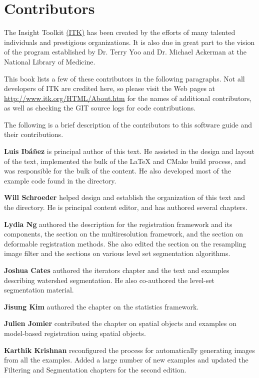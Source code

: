 \chapter*{Contributors}
\noindent

The Insight Toolkit \href{http://www.itk.org}{(ITK)} has been created by the
efforts of many talented individuals and prestigious organizations. It is also
due in great part to the vision of the program established by Dr. Terry Yoo
and Dr. Michael Ackerman at the National Library of Medicine.

This book lists a few of these contributors in the following paragraphs. Not
all developers of ITK are credited here, so please visit the Web pages at
\href{http://www.itk.org/HTML/About.htm}{http://www.itk.org/HTML/About.htm}
for the names of additional contributors, as well as checking the GIT source
logs for code contributions.

The following is a brief description of the contributors to this software
guide and their contributions.


{\bf Luis Ib\'{a}\~{n}ez} is principal author of this text.
He assisted in the design and layout of the text, implemented the bulk of
the \LaTeX{} and CMake build process, and was responsible for the bulk of
the content. He also developed most of the example code found in the
 directory.

{\bf Will Schroeder} helped design and establish the organization
of this text and the  directory. He is principal
content editor, and has authored several chapters.

{\bf Lydia Ng} authored the description for the registration framework
and its components, the section on the multiresolution framework, and
the section on deformable registration methods. She also edited the
section on the resampling image filter and the sections on various
level set segmentation algorithms.

{\bf Joshua Cates} authored the iterators chapter and the text and examples
describing watershed segmentation. He also co-authored the level-set
segmentation material.

{\bf Jisung Kim} authored the chapter on the statistics framework.

{\bf Julien Jomier} contributed the chapter on spatial objects and examples on
model-based registration using spatial objects.

{\bf Karthik Krishnan} reconfigured the process for automatically generating
images from all the examples. Added a large number of new examples and updated
the Filtering and Segmentation chapters for the second edition.

